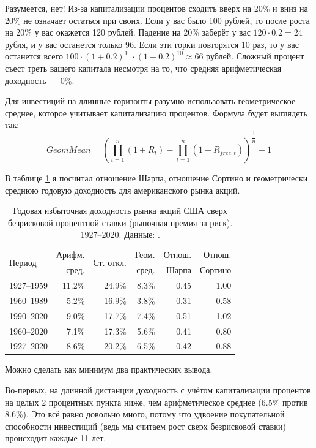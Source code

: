 Разумеется, нет! Из-за капитализации процентов сходить вверх на 20\% и вниз на 
20\% не означает остаться при своих. Если у вас было 100 рублей, то после роста 
на 20\% у вас окажется 120 рублей. Падение на 20\% заберёт у вас $120 \cdot 0.2 
= 24$ рубля, и у вас останется только 96. Если эти горки повторятся 10 раз, то 
у вас останется всего $100 \cdot (1 + 0.2)^{10} \cdot (1 - 0.2)^{10} \approx 66$ 
рублей. Сложный процент съест треть вашего капитала несмотря на то, что средняя 
арифметическая доходность --- 0\%.

Для инвестиций на длинные горизонты разумно использовать геометрическое среднее, 
которое учитывает капитализацию процентов. Формула будет выглядеть так:
\begin{equation*}
GeomMean = \left(
    \prod\limits_{t=1}^{n}(1 + R_t) -
    \prod\limits_{t=1}^{n}(1 + R_{free,t})
\right) ^ {\dfrac{1}{n}} - 1
\end{equation*}

В таблице  \ref{us_market_sharpe_ratio} я посчитал отношение Шарпа, отношение 
Сортино и геометрически среднюю годовую доходность для американского рынка 
акций.

\begin{table}[ht]
\centering
\begin{tabular}{l|r|r|r|r|r}
\multirow{2}{*}{Период} &
Арифм. & 
\multirow{2}{*}{Ст. откл.} &
Геом. &
Отнош. &
Отнош. \\
& сред. & & сред. & Шарпа & Сортино \\ 
\hline
1927--1959 & 11.2\% & 24.9\% & 8.3\% & 0.45 & 1.00 \\
1960--1989 &  5.2\% & 16.9\% & 3.8\% & 0.31 & 0.58 \\
1990--2020 &  9.0\% & 17.7\% & 7.4\% & 0.51 & 1.02 \\
1960--2020 &  7.1\% & 17.3\% & 5.6\% & 0.41 & 0.80 \\ \hline
1927--2020 &  8.6\% & 20.2\% & 6.5\% & 0.42 & 0.88 \\
\end{tabular}
\caption{Годовая избыточная доходность рынка акций США сверх безрисковой 
процентной ставки (рыночная премия за риск). 1927--2020. Данные: 
\cite{kennethFrench}.}
\label{us_market_sharpe_ratio}
\end{table}

Можно сделать как минимум два практических вывода.

Во-первых, на длинной дистанции доходность с учётом капитализации процентов
на целых 2 процентных пункта ниже, чем арифметическое среднее (6.5\% против 
8.6\%). Это всё равно довольно много, потому что удвоение покупательной 
способности инвестиций (ведь мы считаем рост сверх безрисковой ставки) 
происходит каждые 11 лет.

